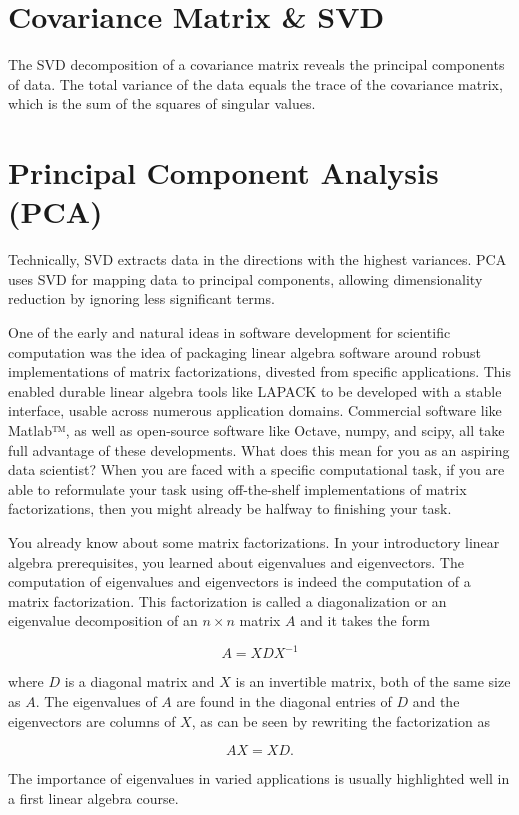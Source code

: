 \documentclass{ximera}
\begin{document}
\section{Covariance Matrix \& SVD}
The SVD decomposition of a covariance matrix reveals the principal components of data. The total variance of the data equals the trace of the covariance matrix, which is the sum of the squares of singular values.

\section{Principal Component Analysis (PCA)}
Technically, SVD extracts data in the directions with the highest variances. PCA uses SVD for mapping data to principal components, allowing dimensionality reduction by ignoring less significant terms.

One of the early and natural ideas in software development for scientific computation was the idea of packaging linear algebra software around robust implementations of matrix factorizations, divested from specific applications. This enabled durable linear algebra tools like LAPACK to be developed with a stable interface, usable across numerous application domains. Commercial software like Matlab™, as well as open-source software like Octave, numpy, and scipy, all take full advantage of these developments. What does this mean for you as an aspiring data scientist? When you are faced with a specific computational task, if you are able to reformulate your task using off-the-shelf implementations of matrix factorizations, then you might already be halfway to finishing your task.

You already know about some matrix factorizations. In your introductory linear algebra prerequisites, you learned about eigenvalues and eigenvectors. The computation of eigenvalues and eigenvectors is indeed the computation of a matrix factorization. This factorization is called a diagonalization or an eigenvalue decomposition of an \( n \times n \) matrix \( A \) and it takes the form

\[
A = X D X^{-1}
\]

where \( D \) is a diagonal matrix and \( X \) is an invertible matrix, both of the same size as \( A \). The eigenvalues of \( A \) are found in the diagonal entries of \( D \) and the eigenvectors are columns of \( X \), as can be seen by rewriting the factorization as

\[
A X = X D.
\]

The importance of eigenvalues in varied applications is usually highlighted well in a first linear algebra course.
\end{document}
